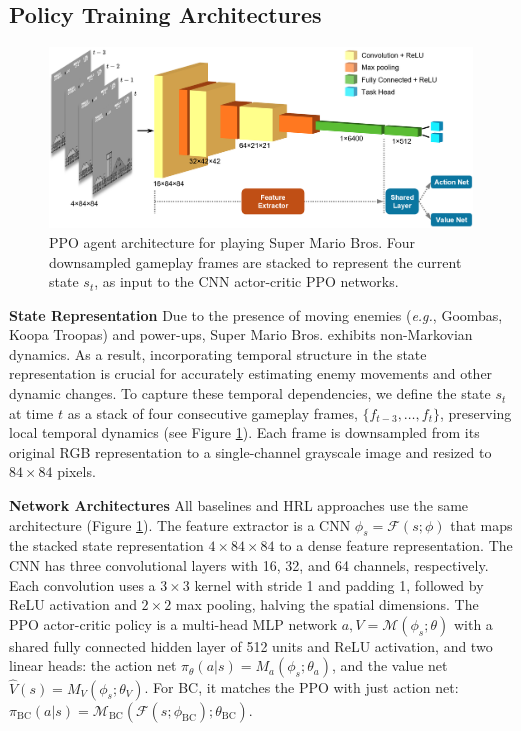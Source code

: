 \documentclass{article}
\begin{document}
\subsection{Policy Training Architectures}

\begin{figure}[htbp]
      \centering
      \includegraphics[width=\columnwidth]{figures/architecture.png}
      \caption{PPO agent architecture for playing Super Mario Bros.
      Four downsampled gameplay frames are stacked 
      to represent the current state $s_t$, as input to the CNN actor-critic PPO
      networks.}
      \label{fig:arch}
\end{figure}

\textbf{State Representation}
Due to the presence of moving enemies (\textit{e.g.}, Goombas, Koopa Troopas) 
and power-ups, Super Mario Bros. exhibits non-Markovian dynamics.
As a result, incorporating temporal structure in the state representation is 
crucial for accurately estimating enemy movements and other dynamic changes. 
To capture these temporal dependencies, we define the state $s_t$ at time $t$ 
as a stack of four consecutive gameplay frames, $\{ f_{t-3}, \dots, f_t \}$, 
preserving local temporal dynamics (see Figure \ref{fig:arch}). 
Each frame is downsampled from its original RGB representation to a 
single-channel grayscale image and resized to $84 \times 84$ pixels.

\textbf{Network Architectures}
All baselines and HRL approaches use the same architecture 
(Figure \ref{fig:arch}). The feature extractor is a CNN 
$\phi_s = \mathcal{F}(s;\phi)$ that maps the stacked state 
representation \(4 \times 84 \times 84\) to a dense feature 
representation. The CNN has three convolutional layers with 16, 32, 
and 64 channels, respectively. Each convolution uses a \(3 \times 3\) 
kernel with stride 1 and padding 1, followed by ReLU activation and 
\(2 \times 2\) max pooling, halving the spatial dimensions. 
The PPO actor-critic policy 
is a multi-head MLP network $a, V = \mathcal{M}(\phi_s; \theta)$ with a 
shared fully connected hidden layer of 512 units and 
ReLU activation, and two linear heads:
the action net $ \pi_\theta(a|s) = M_a(\phi_s;\theta_a)$,
and the value net ${\hat V}(s) = M_V(\phi_s;\theta_V)$.
For BC, it matches the PPO with just action net:
$ \pi_{\text{BC}}(a|s) =
\mathcal{M}_{\text{BC}}(\mathcal{F}(s;\phi_{\text{BC}});\theta_{\text{BC}})$.
\end{document}
